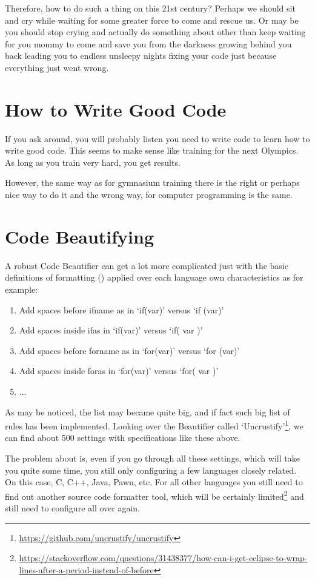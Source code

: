     Therefore, how to do such a thing on this 21\q{}st century?
    Perhaps we should sit and cry while waiting for some greater force to come
    and rescue us. Or may be you should stop crying and actually do something
    about other than keep waiting for you mommy to come and save you from the
    darkness growing behind you back leading you to endless unsleepy nights
    fixing your code just because everything just went wrong.



    \section{How to Write Good Code}

    If you ask around, you will probably listen you need to write code to learn
    how to write good code. This seems to make sense like training for the next
    Olympics. As long as you train very hard,
    you get results.

    However, the same way as for gymnasium training there is the right or
    perhaps nice way to do it and the wrong way,
    for computer programming is the same.



    \section{Code Beautifying}

    A robust Code Beautifier can get a lot more complicated just with the basic
    definitions of formatting ()
    applied over each language own characteristics
    as for example:

    \begin{enumerate}
        \item Add spaces before if\s name as in `if(var)' versus `if (var)'
        \item Add spaces inside if\s as in `if(var)' versus `if( var )'
        \item Add spaces before for\s name as in `for(var)' versus `for (var)'
        \item Add spaces inside for\s as in `for(var)' versus `for( var )'
        \item ...
    \end{enumerate}

    As may be noticed, the list may became quite big,
    and if fact such big list of rules has been implemented.
    Looking over the Beautifier called
    `Uncrustify'\footnote{\url{https://github.com/uncrustify/uncrustify}},
    we can find about 500 settings with specifications like these above.

    The problem about is, even if you go through all these settings,
    which will take you quite some time,
    you still only configuring a few languages closely related.
    On this case, C, C++, Java, Pawn, etc.
    For all other languages you still need to find out another source code
    formatter tool, which will be certainly
    limited\footnote{\url{https://stackoverflow.com/questions/31438377/how-can-i-get-eclipse-to-wrap-lines-after-a-period-instead-of-before}}
    and still need to configure all over again.


